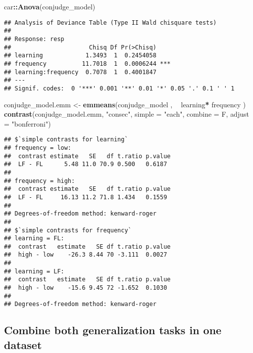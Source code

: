 \documentclass[
]{article}
\newenvironment{Shaded}{\begin{snugshade}}{\end{snugshade}}
\newcommand{\DataTypeTok}[1]{\textcolor[rgb]{0.13,0.29,0.53}{#1}}
\newcommand{\KeywordTok}[1]{\textcolor[rgb]{0.13,0.29,0.53}{\textbf{#1}}}
\newcommand{\NormalTok}[1]{#1}
\newcommand{\OperatorTok}[1]{\textcolor[rgb]{0.81,0.36,0.00}{\textbf{#1}}}
\newcommand{\StringTok}[1]{\textcolor[rgb]{0.31,0.60,0.02}{#1}}
\begin{document}
\begin{Shaded}
\begin{Highlighting}[]
\NormalTok{car}\OperatorTok{::}\KeywordTok{Anova}\NormalTok{(conjudge_model)}
\end{Highlighting}
\end{Shaded}

\begin{verbatim}
## Analysis of Deviance Table (Type II Wald chisquare tests)
## 
## Response: resp
##                      Chisq Df Pr(>Chisq)    
## learning            1.3493  1  0.2454058    
## frequency          11.7018  1  0.0006244 ***
## learning:frequency  0.7078  1  0.4001847    
## ---
## Signif. codes:  0 '***' 0.001 '**' 0.01 '*' 0.05 '.' 0.1 ' ' 1
\end{verbatim}

\begin{Shaded}
\begin{Highlighting}[]
\NormalTok{conjudge_model.emm <-}\StringTok{ }\KeywordTok{emmeans}\NormalTok{(conjudge_model , }\OperatorTok{~}\StringTok{ }\NormalTok{learning}\OperatorTok{*}\StringTok{ }\NormalTok{frequency )}
\KeywordTok{contrast}\NormalTok{(conjudge_model.emm, }\StringTok{"consec"}\NormalTok{,  }\DataTypeTok{simple =} \StringTok{"each"}\NormalTok{, }\DataTypeTok{combine =}\NormalTok{ F, }\DataTypeTok{adjust =} \StringTok{"bonferroni"}\NormalTok{)}
\end{Highlighting}
\end{Shaded}

\begin{verbatim}
## $`simple contrasts for learning`
## frequency = low:
##  contrast estimate   SE   df t.ratio p.value
##  LF - FL      5.48 11.0 70.9 0.500   0.6187 
## 
## frequency = high:
##  contrast estimate   SE   df t.ratio p.value
##  LF - FL     16.13 11.2 71.8 1.434   0.1559 
## 
## Degrees-of-freedom method: kenward-roger 
## 
## $`simple contrasts for frequency`
## learning = FL:
##  contrast   estimate   SE df t.ratio p.value
##  high - low    -26.3 8.44 70 -3.111  0.0027 
## 
## learning = LF:
##  contrast   estimate   SE df t.ratio p.value
##  high - low    -15.6 9.45 72 -1.652  0.1030 
## 
## Degrees-of-freedom method: kenward-roger
\end{verbatim}

\hypertarget{combine-both-generalization-tasks-in-one-dataset}{%
\subsection{Combine both generalization tasks in one
dataset}\label{combine-both-generalization-tasks-in-one-dataset}}
\end{document}
